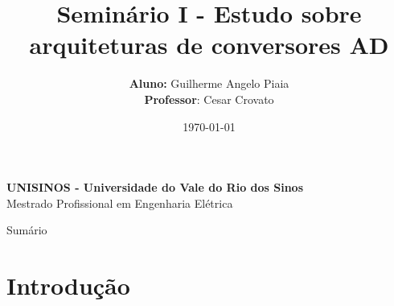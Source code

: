 \documentclass{beamer}
\title[Seminário I - Estudo sobre arquiteturas de conversores AD]{Seminário I - Estudo sobre arquiteturas de conversores AD}
\author[Piaia, G. A.]{
	{\fontsize{10}{8}\selectfont \textbf{Aluno:} Guilherme Angelo Piaia} \\
	{\fontsize{10}{8}\selectfont \textbf{Professor}: Cesar Crovato}
}
\date{\today}
\begin{document}

\begin{frame}
	\begin{minipage}{1\linewidth}
		\centering
		    \textbf{UNISINOS - Universidade do Vale do Rio dos Sinos} \\ Mestrado Profissional em Engenharia Elétrica
	\end{minipage}
	\titlepage
\end{frame}


\begin{frame}{Sumário}
	\tableofcontents[]
\end{frame}


\section{Introdução}
\end{document}
